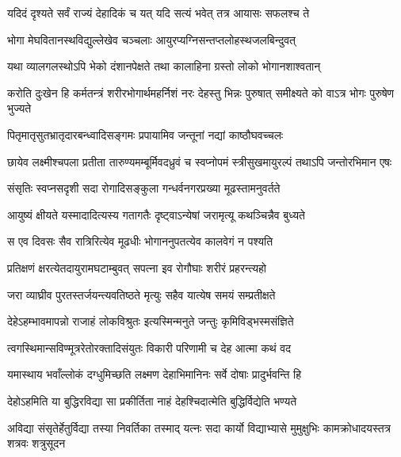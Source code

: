 
\addtocounter{shlokacount}{18}


\twolineshloka
{यदिदं दृश्यते सर्वं राज्यं देहादिकं च यत्}
{यदि सत्यं भवेत् तत्र आयासः सफलश्च ते} %

\twolineshloka
{भोगा मेघवितानस्थविद्युल्लेखेव चञ्चलाः}
{आयुरप्यग्निसन्तप्तलोहस्थजलबिन्दुवत्} %

\twolineshloka
{यथा व्यालगलस्थोऽपि भेको दंशानपेक्षते}
{तथा कालाहिना ग्रस्तो लोको भोगानशाश्वतान्} %

\fourlineindentedshloka
{करोति दुःखेन हि कर्मतन्त्रं}
{शरीरभोगार्थमहर्निशं नरः}
{देहस्तु भिन्नः पुरुषात् समीक्ष्यते}
{को वाऽत्र भोगः पुरुषेण भुज्यते} %

\twolineshloka
{पितृमातृसुतभ्रातृदारबन्ध्वादिसङ्गमः}
{प्रपायामिव जन्तूनां नद्यां काष्ठौघवच्चलः} %

\fourlineindentedshloka
{छायेव लक्ष्मीश्चपला प्रतीता}
{तारुण्यमम्बूर्मिवदध्रुवं च}
{स्वप्नोपमं स्त्रीसुखमायुरल्पं}
{तथाऽपि जन्तोरभिमान एषः} %

\twolineshloka
{संसृतिः स्वप्नसदृशी सदा रोगादिसङ्कुला}
{गन्धर्वनगरप्रख्या मूढस्तामनुवर्तते} %

\twolineshloka
{आयुष्यं क्षीयते यस्मादादित्यस्य गतागतैः}
{दृष्ट्वाऽन्येषां जरामृत्यू कथञ्चिन्नैव बुध्यते} %

\twolineshloka
{स एव दिवसः सैव रात्रिरित्येव मूढधीः}
{भोगाननुपतत्येव कालवेगं न पश्यति} %

\twolineshloka
{प्रतिक्षणं क्षरत्येतदायुरामघटाम्बुवत्}
{सपत्ना इव रोगौघाः शरीरं प्रहरन्त्यहो} %

\twolineshloka
{जरा व्याघ्रीव पुरतस्तर्जयन्त्यवतिष्ठते}
{मृत्युः सहैव यात्येष समयं सम्प्रतीक्षते} %

\twolineshloka
{देहेऽहम्भावमापन्नो राजाहं लोकविश्रुतः}
{इत्यस्मिन्मनुते जन्तुः कृमिविड्भस्मसंज्ञिते} %

\twolineshloka
{त्वगस्थिमान्सविण्मूत्ररेतोरक्तादिसंयुतः}
{विकारी परिणामी च देह आत्मा कथं वद} %

\twolineshloka
{यमास्थाय भवाँल्लोकं दग्धुमिच्छति लक्ष्मण}
{देहाभिमानिनः सर्वे दोषाः प्रादुर्भवन्ति हि} %

\twolineshloka
{देहोऽहमिति या बुद्धिरविद्या सा प्रकीर्तिता}
{नाहं देहश्चिदात्मेति बुद्धिर्विद्येति भण्यते} %

\threelineshloka
{अविद्या संसृतेर्हेतुर्विद्या तस्या निवर्तिका}
{तस्माद् यत्नः सदा कार्यो विद्याभ्यासे मुमुक्षुभिः}
{कामक्रोधादयस्तत्र शत्रवः शत्रुसूदन} %


